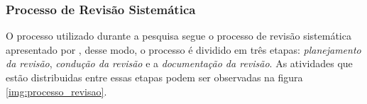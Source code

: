 	 \subsubsection{Processo de Revisão Sistemática}

	 	O processo utilizado durante a pesquisa segue o processo de revisão sistemática apresentado por \cite{Kitchenham}, desse modo, o processo é dividido em três etapas: \textit{planejamento da revisão}, \textit{condução da revisão} e a \textit{documentação da revisão}. As atividades que estão distribuidas entre essas etapas podem ser observadas na figura \ref{img:processo_revisao}.
	
